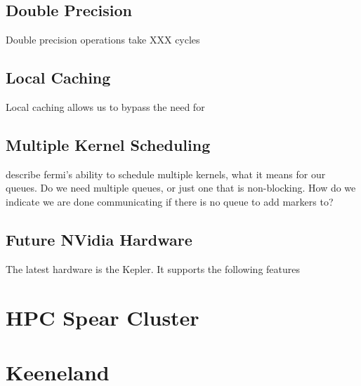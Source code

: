 \subsection{Double Precision}
Double precision operations take XXX cycles


\subsection{Local Caching}
Local caching allows us to bypass the need for 

\subsection{Multiple Kernel Scheduling}
describe fermi's ability to schedule multiple kernels, what it means for our queues. Do we need multiple queues, or just one that is non-blocking. How do we indicate we are done communicating if there is no queue to add markers to? 

\subsection{Future NVidia Hardware}
The latest hardware is the Kepler. It supports the following features

\section{HPC Spear Cluster} 

\section{Keeneland}


%




